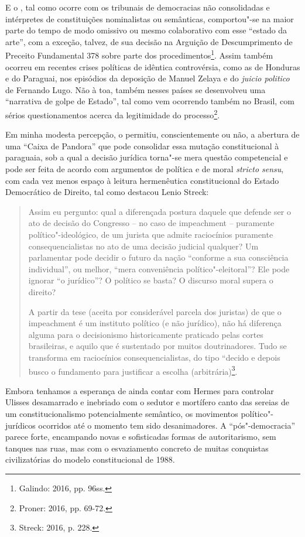 E o , tal como ocorre com os tribunais de democracias não
consolidadas e intérpretes de constituições nominalistas ou semânticas,
comportou"-se na maior parte do tempo de modo omissivo ou mesmo
colaborativo com esse ``estado da arte'', com a exceção, talvez, de sua
decisão na Arguição de Descumprimento de Preceito Fundamental 378 sobre
parte dos procedimentos\footnote{Galindo: 2016, pp. 96ss.}. Assim também ocorreu
em recentes crises políticas de idêntica controvérsia, como as de
Honduras e do Paraguai, nos episódios da deposição de Manuel Zelaya e do
\emph{juicio politico} de Fernando Lugo. Não à toa, também nesses países
se desenvolveu uma ``narrativa de golpe de Estado'', tal como vem
ocorrendo também no Brasil, com sérios questionamentos acerca da
legitimidade do processo\footnote{Proner: 2016, pp. 69-72.}.

Em minha modesta percepção, o  permitiu, conscientemente ou não, a
abertura de uma ``Caixa de Pandora'' que pode consolidar essa mutação
constitucional à paraguaia, sob a qual a decisão jurídica torna"-se mera
questão competencial e pode ser feita de acordo com argumentos de
política e de moral \emph{stricto sensu}, com cada vez menos espaço à
leitura hermenêutica constitucional do Estado Democrático de Direito,
tal como destacou Lenio Streck:

\begin{quote}
Assim eu pergunto: qual a diferençada postura daquele que defende ser o
ato de decisão do Congresso -- no caso de impeachment --
puramente político"-ideológico, de um jurista que admite raciocínios
puramente consequencialistas no ato de uma decisão judicial qualquer? Um
parlamentar pode decidir o futuro da nação ``conforme a sua consciência
individual'', ou melhor, ``mera conveniência político"-eleitoral''? Ele
pode ignorar ``o jurídico''? O político se basta? O discurso moral
supera o direito?

A partir da tese (aceita por considerável parcela dos juristas) de que o
impeachment é um instituto político (e não jurídico), não há
diferença alguma para o decisionismo historicamente praticado pelas
cortes brasileiras, e aquilo que é sustentado por muitos doutrinadores.
Tudo se transforma em raciocínios consequencialistas, do tipo ``decido e
depois busco o fundamento para justificar a escolha (arbitrária)\footnote{Streck: 2016, p. 228.}.
\end{quote}

Embora tenhamos a esperança de ainda contar com Hermes para controlar
Ulisses desamarrado e inebriado com o sedutor e mortífero canto das
sereias de um constitucionalismo potencialmente semântico, os movimentos
político"-jurídicos ocorridos até o momento tem sido desanimadores. A
``pós"-democracia'' parece forte, encampando novas e sofisticadas formas
de autoritarismo, sem tanques nas ruas, mas com o esvaziamento concreto
de muitas conquistas civilizatórias do modelo constitucional de 1988.

